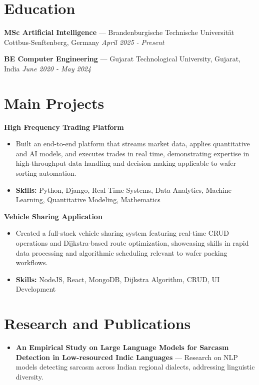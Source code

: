 \documentclass[a4paper,10pt]{article}
\begin{document}
\section*{Education}
\textbf{MSc Artificial Intelligence} — Brandenburgische Technische Universität Cottbus-Senftenberg, Germany \hfill \textit{April 2025 - Present}\par
\vspace{1.5pt}
\textbf{BE Computer Engineering} — Gujarat Technological University, Gujarat, India \hfill \textit{June 2020 - May 2024}\par

\section*{Main Projects}
\textbf{High Frequency Trading Platform}\par
\vspace{1pt}
\begin{itemize}
  \item Built an end-to-end platform that streams market data, applies quantitative and AI models, and executes trades in real time, demonstrating expertise in high-throughput data handling and decision making applicable to wafer sorting automation.
  \item \textbf{Skills:} Python, Django, Real-Time Systems, Data Analytics, Machine Learning, Quantitative Modeling, Mathematics
\end{itemize}
\vspace{3pt}
\textbf{Vehicle Sharing Application}\par
\vspace{1pt}
\begin{itemize}
  \item Created a full-stack vehicle sharing system featuring real-time CRUD operations and Dijkstra-based route optimization, showcasing skills in rapid data processing and algorithmic scheduling relevant to wafer packing workflows.
  \item \textbf{Skills:} NodeJS, React, MongoDB, Dijkstra Algorithm, CRUD, UI Development
\end{itemize}

\section*{Research and Publications}
\begin{itemize}
\item \textbf{An Empirical Study on Large Language Models for Sarcasm Detection in Low-resourced Indic Languages} — Research on NLP models detecting sarcasm across Indian regional dialects, addressing linguistic diversity.
\end{itemize}
\end{document}
